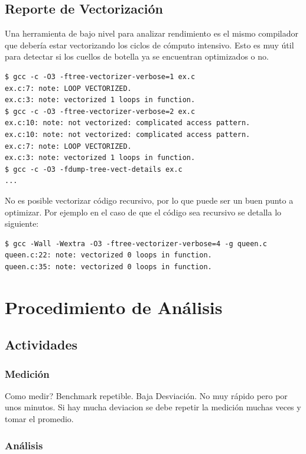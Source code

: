 \documentclass[a4paper]{report}
\begin{document}
\section{Reporte de Vectorizaci\'on}

Una herramienta de bajo nivel para analizar rendimiento es el mismo compilador
que deber\'ia estar vectorizando los ciclos de c\'omputo intensivo. Esto es muy
\'util para detectar si los cuellos de botella ya se encuentran optimizados o no.

\begin{lstlisting}
$ gcc -c -O3 -ftree-vectorizer-verbose=1 ex.c
ex.c:7: note: LOOP VECTORIZED.
ex.c:3: note: vectorized 1 loops in function.
$ gcc -c -O3 -ftree-vectorizer-verbose=2 ex.c
ex.c:10: note: not vectorized: complicated access pattern.
ex.c:10: note: not vectorized: complicated access pattern.
ex.c:7: note: LOOP VECTORIZED.
ex.c:3: note: vectorized 1 loops in function.
$ gcc -c -O3 -fdump-tree-vect-details ex.c
...
\end{lstlisting}

No es posible vectorizar c\'odigo recursivo, por lo que puede ser un buen punto a
optimizar. Por ejemplo en el caso de que el c\'odigo sea recursivo se detalla lo siguiente:

{\small
\begin{verbatim}
$ gcc -Wall -Wextra -O3 -ftree-vectorizer-verbose=4 -g queen.c
queen.c:22: note: vectorized 0 loops in function.
queen.c:35: note: vectorized 0 loops in function.
\end{verbatim}
}

\chapter{Procedimiento de An\'alisis}

\section{Actividades}

\subsection{Medici\'on}

Como medir? Benchmark repetible. Baja Desviaci\'on. No muy r\'apido pero por unos
minutos. Si hay mucha deviacion se debe repetir la medici\'on muchas veces y
tomar el promedio.

\subsection{An\'alisis}
\end{document}
